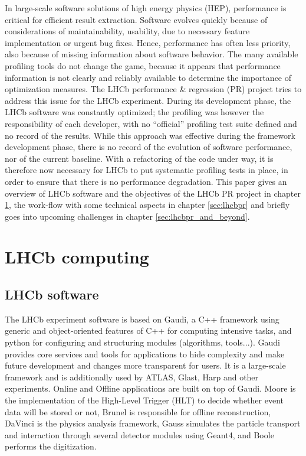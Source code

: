 \documentclass[a4paper]{jpconf}
\begin{document}
In large-scale software solutions of high energy physics (HEP), performance is critical for efficient result extraction. Software evolves quickly because of considerations of maintainability, usability, due to necessary feature implementation or urgent bug fixes. Hence, performance has often less priority, also because of missing information about software behavior. The many available profiling tools do not change the game, because it appears that performance information is not clearly and reliably available to determine the importance of optimization measures. The LHCb performance \& regression (PR) project tries to address this issue for the LHCb experiment.
\newline
During its development phase, the LHCb software was constantly optimized; the profiling was however the responsibility of each developer, with no ``official'' profiling test suite defined and no record of the results. While this approach was effective during the framework development phase, there is no record of the evolution of software performance, nor of the current baseline. With a refactoring of the code under way, it is therefore now necessary for LHCb to put systematic profiling tests in place, in order to ensure that there is no performance degradation.
\newline
This paper gives an overview of LHCb software and the objectives of the LHCb PR project in chapter \ref{sec:lhcb_computing}, the work-flow with some technical aspects in chapter \ref{sec:lhcbpr} and briefly goes into upcoming challenges in chapter \ref{sec:lhcbpr_and_beyond}.

\section{LHCb computing}
\label{sec:lhcb_computing}

\subsection{LHCb software}
\label{sec:lhcb_software}

The LHCb experiment software is based on Gaudi\cite{gaudi}, a C++ framework using generic and object-oriented features of C++ for computing intensive tasks, and python for configuring and structuring modules (algorithms, tools...). Gaudi provides core services and tools for applications to hide complexity and make future development and changes more transparent for users. It is a large-scale framework and is additionally used by ATLAS, Glast, Harp and other experiments.
\newline
Online and Offline applications are built on top of Gaudi. Moore is the implementation of the High-Level Trigger (HLT) to decide whether event data will be stored or not, Brunel is responsible for offline reconstruction, DaVinci is the physics analysis framework, Gauss simulates the particle transport and interaction through several detector modules using Geant4, and Boole performs the digitization.
\end{document}
